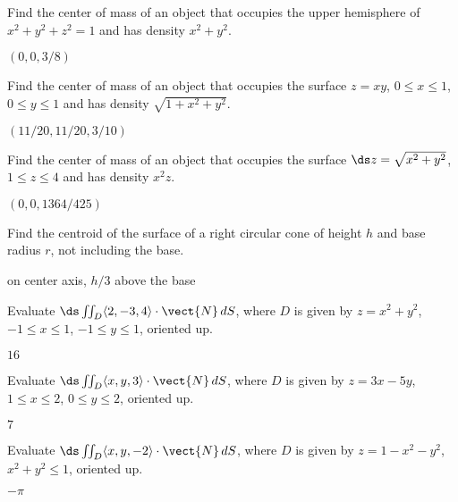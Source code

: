\begin{enumialphparenastyle}

\begin{ex}
Find the center of mass of an object that occupies the upper
hemisphere of $x^2+y^2+z^2=1$ and has density $x^2+y^2$.
\begin{sol}
	$(0,0,3/8)$
\end{sol}
\end{ex}

\begin{ex}
Find the center of mass of an object that occupies the
surface $z=xy$, $0\le x\le1$, $0\le y\le 1$ and has density $\sqrt{1+x^2+y^2}$.
\begin{sol}
	$(11/20,11/20,3/10)$
\end{sol}
\end{ex}

\begin{ex}
Find the center of mass of an object that occupies the
surface $\ds z=\sqrt{x^2+y^2}$, $1\le z\le4$ and has density $x^2z$.
\begin{sol}
	$(0,0,1364/425)$
\end{sol}
\end{ex}

\begin{ex}
Find the centroid of the surface of a right circular cone of
height $h$ and base radius $r$, not including the base.
\begin{sol}
	on center axis, $h/3$ above the base
\end{sol}
\end{ex}

\begin{ex}
Evaluate $\ds \iint_{D} \langle 2,-3,4\rangle\cdot \vect{N}\,dS$, where $D$ is given by $z=x^2+y^2$, $-1\le x\le 1$, $-1\le
y\le 1$, oriented up.
\begin{sol}
	$16$
\end{sol}
\end{ex}

\begin{ex}
Evaluate $\ds \iint_{D} \langle x,y,3\rangle\cdot\vect{N}\,dS$, where $D$ is given by $z=3x-5y$, $1\le x\le 2$, $0\le
y\le 2$, oriented up.
\begin{sol}
	$7$
\end{sol}
\end{ex}

\begin{ex}
Evaluate $\ds \iint_{D} \langle x,y,-2\rangle\cdot \vect{N}\,dS$, where $D$ is given by $z=1-x^2-y^2$, $x^2+y^2\le1$,
oriented up.
\begin{sol}
	$-\pi$
\end{sol}
\end{ex}


\end{enumialphparenastyle}
